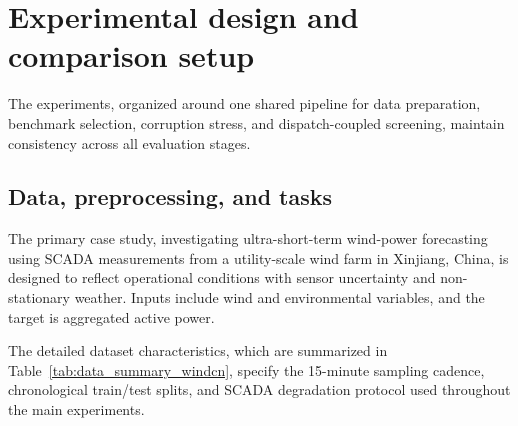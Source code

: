 \documentclass[review,1p,times]{elsarticle}
\begin{document}
\section{Experimental design and comparison setup}
\label{sec:design}

The experiments, organized around one shared pipeline for data preparation, benchmark selection, corruption stress, and dispatch-coupled screening, maintain consistency across all evaluation stages.

\subsection{Data, preprocessing, and tasks}

The primary case study, investigating ultra-short-term wind-power forecasting using SCADA measurements from a utility-scale wind farm in Xinjiang, China, is designed to reflect operational conditions with sensor uncertainty and non-stationary weather. Inputs include wind and environmental variables, and the target is aggregated active power.

The detailed dataset characteristics, which are summarized in Table~\ref{tab:data_summary_windcn}, specify the 15-minute sampling cadence, chronological train/test splits, and SCADA degradation protocol used throughout the main experiments.
\end{document}
